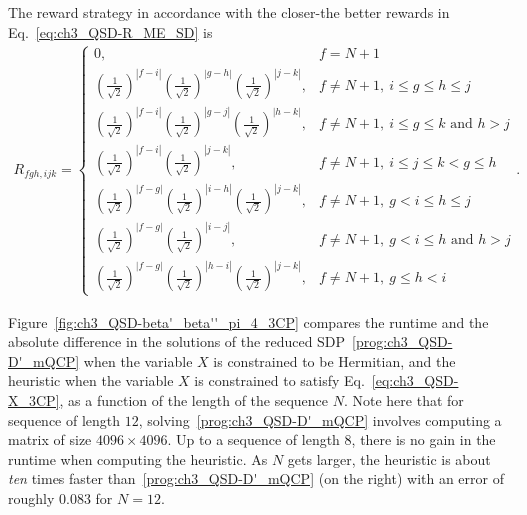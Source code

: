 \begin{appendices}
The reward strategy in accordance with the closer-the better rewards in Eq.~\eqref{eq:ch3_QSD-R_ME_SD} is
\begin{align}
    \label{eq:ch3_QSD-3CP_ctbr}
    R_{fgh, ijk} =
    \begin{cases}
        0, & f = N+1 \\
        \left( \frac{1}{\sqrt{2}} \right)^{|f-i|} \left( \frac{1}{\sqrt{2}} \right)^{|g-h|} \left( \frac{1}{\sqrt{2}} \right)^{|j-k|}, & f \ne N+1,\ i \le g \le h \le j \\
        \left( \frac{1}{\sqrt{2}} \right)^{|f-i|} \left( \frac{1}{\sqrt{2}} \right)^{|g-j|} \left( \frac{1}{\sqrt{2}} \right)^{|h-k|}, & f \ne N+1,\ i \le g \le k \text{ and } h > j \\
        \left( \frac{1}{\sqrt{2}} \right)^{|f-i|} \left( \frac{1}{\sqrt{2}} \right)^{|j-k|}, & f \ne N+1,\ i \le j \le k < g \le h \\
        \left( \frac{1}{\sqrt{2}} \right)^{|f-g|} \left( \frac{1}{\sqrt{2}} \right)^{|i-h|} \left( \frac{1}{\sqrt{2}} \right)^{|j-k|}, & f \ne N+1,\ g < i \le h \le j \\
        \left( \frac{1}{\sqrt{2}} \right)^{|f-g|} \left( \frac{1}{\sqrt{2}} \right)^{|i-j|}, & f \ne N+1,\ g < i \le h \text{ and } h > j \\
        \left( \frac{1}{\sqrt{2}} \right)^{|f-g|} \left( \frac{1}{\sqrt{2}} \right)^{|h-i|} \left( \frac{1}{\sqrt{2}} \right)^{|j-k|}, & f \ne N+1,\ g \le h < i
    \end{cases}. 
\end{align}

Figure~\ref{fig:ch3_QSD-beta'_beta''_pi_4_3CP} compares the runtime and the absolute difference in the solutions of the reduced SDP~\eqref{prog:ch3_QSD-D'_mQCP} when the variable $X$ is constrained to be Hermitian, and the heuristic when the variable $X$ is constrained to satisfy Eq.~\eqref{eq:ch3_QSD-X_3CP}, as a function of the length of the sequence $N$.
Note here that for sequence of length $12$, solving~\eqref{prog:ch3_QSD-D'_mQCP} involves computing a matrix of size $4096 \times 4096$.
Up to a sequence of length $8$, there is no gain in the runtime when computing the heuristic.
As $N$ gets larger, the heuristic is about \emph{ten} times faster than~\eqref{prog:ch3_QSD-D'_mQCP} (on the right) with an error of roughly $0.083$ for $N = 12$.


\end{appendices}
